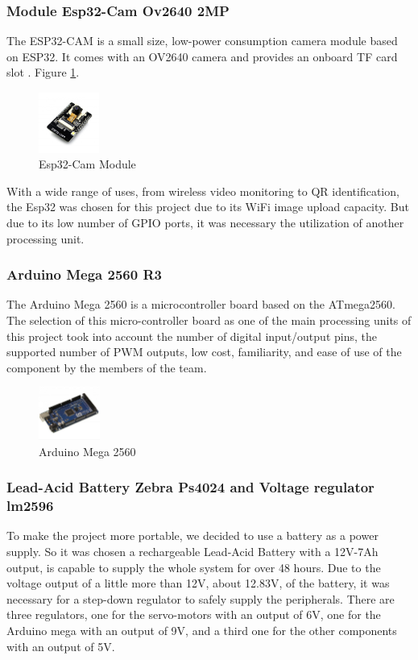 \documentclass[a4paper,11pt]{article}
\begin{document}
\subsubsection{Module Esp32-Cam Ov2640 2MP}
\label{subsubsec:esp32}
The ESP32-CAM is a small size, low-power consumption camera module based on ESP32. It comes with an OV2640 camera and provides an onboard TF card slot \cite{evelta}. Figure \ref{fig:Esp32}.

\begin{figure}[H]
  \centering
  \includegraphics[width=2cm]{Figures/esp32cam-1024x1024.jpg}
  \caption{\small{Esp32-Cam Module}}
  \label{fig:Esp32}
\end{figure}

With a wide range of uses, from wireless video monitoring to QR identification, the Esp32 was chosen for this project due to its WiFi image upload capacity. But due to its low number of GPIO ports, it was necessary the utilization of another processing unit.

\subsubsection{Arduino Mega 2560 R3}
\label{subsubsec:arduino}
The Arduino Mega 2560 is a microcontroller board based on the ATmega2560. The selection of this micro-controller board as one of the main processing units of this project took into account the number of digital input/output pins, the supported number of PWM outputs, low cost, familiarity, and ease of use of the component by the members of the team\cite{arduino}.

\begin{figure}[H]
  \centering
  \includegraphics[width=2cm]{Figures/arduinoMega.jpg}
  \caption{\small{Arduino Mega 2560}}
  \label{fig:Arduino}
\end{figure}

\subsubsection{Lead-Acid Battery Zebra Ps4024 and Voltage regulator lm2596}
\label{subsubsec:battery}
To make the project more portable, we decided to use a battery as a power supply. So it was chosen a rechargeable Lead-Acid Battery with a 12V-7Ah output, is capable to supply the whole system for over 48 hours. Due to the voltage output of a little more than 12V, about 12.83V, of the battery, it was necessary for a step-down regulator to safely supply the peripherals. There are three regulators, one for the servo-motors with an output of 6V, one for the Arduino mega with an output of 9V, and a third one for the other components with an output of 5V.
\end{document}
